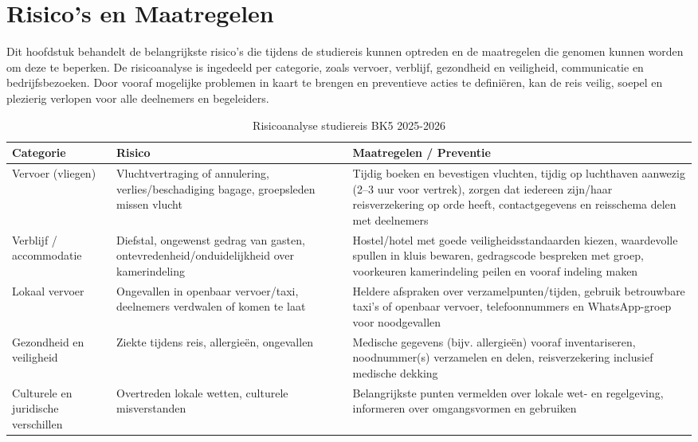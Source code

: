 \section{Risico's en Maatregelen}

Dit hoofdstuk behandelt de belangrijkste risico’s die tijdens de studiereis kunnen optreden en de maatregelen die genomen kunnen worden om deze te beperken. De risicoanalyse is ingedeeld per categorie, zoals vervoer, verblijf, gezondheid en veiligheid, communicatie en bedrijfsbezoeken. Door vooraf mogelijke problemen in kaart te brengen en preventieve acties te definiëren, kan de reis veilig, soepel en plezierig verlopen voor alle deelnemers en begeleiders.

\begin{table}[h!]
	\centering
	\caption{Risicoanalyse studiereis BK5 2025-2026}
	\label{tab:risicoanalyse}
	\begin{tabular}{|l|p{6cm}|p{5cm}|}
		\hline
		\textbf{Categorie} & \textbf{Risico} & \textbf{Maatregelen / Preventie} \\
		\hline
		Vervoer (vliegen) & Vluchtvertraging of annulering, verlies/beschadiging bagage, groepsleden missen vlucht & Tijdig boeken en bevestigen vluchten, tijdig op luchthaven aanwezig (2–3 uur voor vertrek), zorgen dat iedereen zijn/haar reisverzekering op orde heeft, contactgegevens en reisschema delen met deelnemers \\
		\hline
		Verblijf / accommodatie & Diefstal, ongewenst gedrag van gasten, ontevredenheid/onduidelijkheid over kamerindeling & Hostel/hotel met goede veiligheidsstandaarden kiezen, waardevolle spullen in kluis bewaren, gedragscode bespreken met groep, voorkeuren kamerindeling peilen en vooraf indeling maken \\
		\hline
		Lokaal vervoer & Ongevallen in openbaar vervoer/taxi, deelnemers verdwalen of komen te laat & Heldere afspraken over verzamelpunten/tijden, gebruik betrouwbare taxi’s of openbaar vervoer, telefoonnummers en WhatsApp-groep voor noodgevallen \\
		\hline
		Gezondheid en veiligheid & Ziekte tijdens reis, allergieën, ongevallen & Medische gegevens (bijv. allergieën) vooraf inventariseren, noodnummer(s) verzamelen en delen, reisverzekering inclusief medische dekking \\
		\hline
		Culturele en juridische verschillen & Overtreden lokale wetten, culturele misverstanden & Belangrijkste punten vermelden over lokale wet- en regelgeving, informeren over omgangsvormen en gebruiken \\

\end{tabular}
\end{table}

